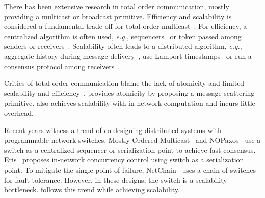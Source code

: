 There has been extensive research in total order communication, mostly providing a multicast or broadcast primitive.
Efficiency and scalability is considered a fundamental trade-off for total order multicast~\cite{defago2004total}.
For efficiency, a centralized algorithm is often used, \textit{e.g.}, sequencers~\cite{eris} or token passed among senders or receivers~\cite{rajagopalan1989token,kim1997total,ekwall2004token}.
Scalability often leads to a distributed algorithm, \textit{e.g.}, aggregate history during message delivery~\cite{chandra1996unreliable}, use Lamport timestamps~\cite{lamport1978time} or run a consensus protocol among receivers~\cite{lamport1998part}.

Critics of total order communication blame the lack of atomicity and limited scalability and efficiency~\cite{cheriton1994understanding}.
\sys provides atomicity by proposing a message scattering primitive. \sys also achieves scalability with in-network computation and incurs little overhead.

Recent years witness a trend of co-designing distributed systems with programmable network switches.
Mostly-Ordered Multicast~\cite{ports2015designing} and NOPaxos~\cite{li2016just} use a switch as a centralized sequencer or serialization point to achieve fast consensus.
Eris~\cite{eris} proposes in-network concurrency control using switch as a serialization point.
To mitigate the single point of failure, NetChain~\cite{jin2018netchain} uses a chain of switches for fault tolerance.
However, in these designs, the switch is a scalability bottleneck.
\sys follows this trend while achieving scalability.




